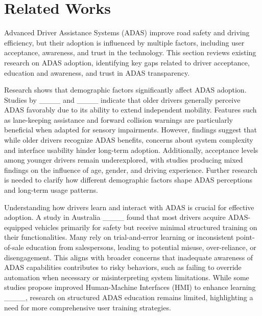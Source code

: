 \section{Related Works}
Advanced Driver Assistance Systems (ADAS) improve road safety and driving efficiency, but their adoption is influenced by multiple factors, including user acceptance, awareness, and trust in the technology. This section reviews existing research on ADAS adoption, identifying key gaps related to driver acceptance, education and awareness, and trust in ADAS transparency.

Research shows that demographic factors significantly affect ADAS adoption. Studies by ____ and ____ indicate that older drivers generally perceive ADAS favorably due to its ability to extend independent mobility. Features such as lane-keeping assistance and forward collision warnings are particularly beneficial when adapted for sensory impairments. However, findings suggest that while older drivers recognize ADAS benefits, concerns about system complexity and interface usability hinder long-term adoption. Additionally, acceptance levels among younger drivers remain underexplored, with studies producing mixed findings on the influence of age, gender, and driving experience. Further research is needed to clarify how different demographic factors shape ADAS perceptions and long-term usage patterns.

Understanding how drivers learn and interact with ADAS is crucial for effective adoption. A study in Australia ____ found that most drivers acquire ADAS-equipped vehicles primarily for safety but receive minimal structured training on their functionalities. Many rely on trial-and-error learning or inconsistent point-of-sale education from salespersons, leading to potential misuse, over-reliance, or disengagement. This aligns with broader concerns that inadequate awareness of ADAS capabilities contributes to risky behaviors, such as failing to override automation when necessary or misinterpreting system limitations. While some studies propose improved Human-Machine Interfaces (HMI) to enhance learning ____, research on structured ADAS education remains limited, highlighting a need for more comprehensive user training strategies.

